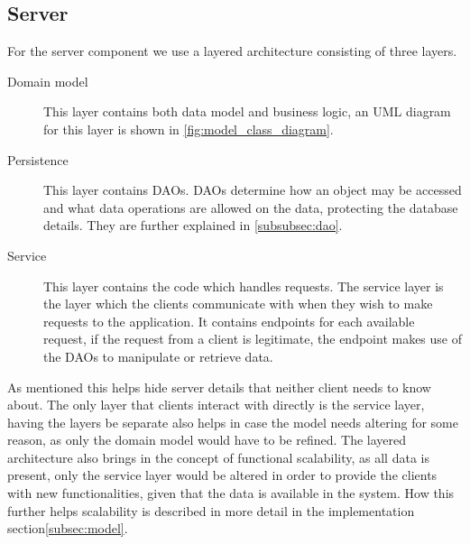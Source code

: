 \subsection{Server}
For the server component we use a layered architecture consisting of three layers.
\begin{description}
    \item [Domain model] This layer contains both data model and business logic, an UML diagram for this layer is shown in \cref{fig:model_class_diagram}.
    \item [Persistence] This layer contains \aclp{DAO}.
    \acsp{DAO} determine how an object may be accessed and what data operations are allowed on the data, protecting the database details.
    They are further explained in \cref{subsubsec:dao}.
    \item [Service] This layer contains the code which handles requests.
    The service layer is the layer which the clients communicate with when they wish to make requests to the application.
    It contains endpoints for each available request, if the request from a client is legitimate, the endpoint makes use of the \acsp{DAO} to manipulate or retrieve data.
\end{description}
As mentioned this helps hide server details that neither client needs to know about.
The only layer that clients interact with directly is the service layer, having the layers be separate also helps in case the model needs altering for some reason, as only the domain model would have to be refined.
The layered architecture also brings in the concept of functional scalability, as all data is present, only the service layer would be altered in order to provide the clients with new functionalities, given that the data is available in the system.
How this further helps scalability is described in more detail in the implementation section\cref{subsec:model}.

